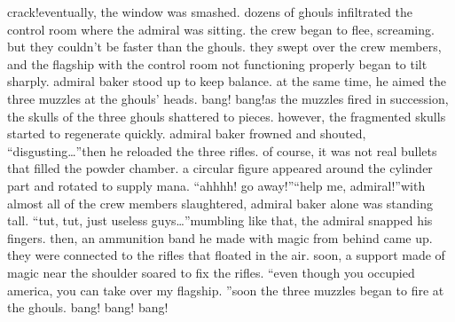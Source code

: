 crack!eventually, the window was smashed.
 dozens of ghouls infiltrated the control room where the admiral was sitting.
the crew began to flee, screaming.
 but they couldn’t be faster than the ghouls.
they swept over the crew members, and the flagship with the control room not functioning properly began to tilt sharply.
admiral baker stood up to keep balance.
 at the same time, he aimed the three muzzles at the ghouls’ heads.
bang! bang!as the muzzles fired in succession, the skulls of the three ghouls shattered to pieces.
however, the fragmented skulls started to regenerate quickly.
admiral baker frowned and shouted, “disgusting…”then he reloaded the three rifles.
 of course, it was not real bullets that filled the powder chamber.
 a circular figure appeared around the cylinder part and rotated to supply mana.
“ahhhh! go away!”“help me, admiral!”with almost all of the crew members slaughtered, admiral baker alone was standing tall.
“tut, tut, just useless guys…”mumbling like that, the admiral snapped his fingers.
 then, an ammunition band he made with magic from behind came up.
 they were connected to the rifles that floated in the air.
soon, a support made of magic near the shoulder soared to fix the rifles.
“even though you occupied america, you can take over my flagship.
”soon the three muzzles began to fire at the ghouls.
bang! bang! bang!

 